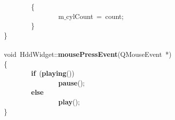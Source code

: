 \mbox{}\ \ \ \ \ \ \ \ \{ \\
\mbox{}\ \ \ \ \ \ \ \ \ \ \ \ \ \ \ \ m$\_$cylCount\ =\ count; \\
\mbox{}\ \ \ \ \ \ \ \ \} \\
\mbox{}\} \\
\mbox{} \\
\mbox{}void\ HddWidget::\textbf{mousePressEvent}(QMouseEvent\ *) \\
\mbox{}\{ \\
\mbox{}\ \ \ \ \ \ \ \ \textbf{if}\ (\textbf{playing}()) \\
\mbox{}\ \ \ \ \ \ \ \ \ \ \ \ \ \ \ \ \textbf{pause}(); \\
\mbox{}\ \ \ \ \ \ \ \ \textbf{else} \\
\mbox{}\ \ \ \ \ \ \ \ \ \ \ \ \ \ \ \ \textbf{play}(); \\
\mbox{}\} \\
\mbox{}
